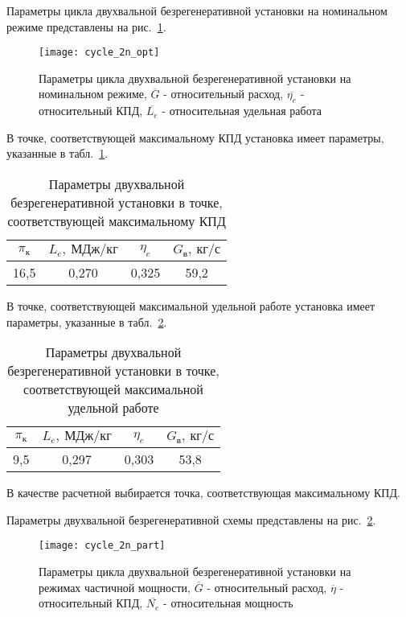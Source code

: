 Параметры цикла двухвальной безрегенеративной установки на номинальном режиме представлены на рис.~\ref{img:cycle_2n_opt}.

\begin{figure}[H]
    \centering
    \texttt{[image: cycle\_2n\_opt]}
    \caption{Параметры цикла двухвальной безрегенеративной установки на номинальном режиме,
	$\overline{G}$ - относительный расход, $\overline{\eta_e}$ - относительный КПД, $\overline{L_e}$ - относительная удельная работа}
    \label{img:cycle_2n_opt}
\end{figure}

В точке, соответствующей максимальному КПД установка имеет параметры, указанные в табл.~\ref{tab:cycle_2n_max_eta}.

\clearpage
\begin{longtable}{|c|c|c|c|}
	\caption{Параметры двухвальной безрегенеративной установки в точке, соответствующей максимальному КПД}
	\label{tab:cycle_2n_max_eta}
	\hline
	\textbf{$\pi_к$} & \textbf{$L_e, \ МДж/кг$} & \textbf{$\eta_e$} & \textbf{$G_в, \ кг/с$} \\ \hline
	16,5 & 0,270 & 0,325 & 59,2 \\ \hline
\end{longtable}


В точке, соответствующей максимальной удельной работе установка имеет параметры, указанные в табл.~\ref{tab:cycle_2n_max_labour}.
\begin{longtable}{|c|c|c|c|}
	\caption{Параметры двухвальной безрегенеративной установки в точке, соответствующей максимальной удельной работе} 
	\label{tab:cycle_2n_max_labour}
	\hline
	\textbf{$\pi_к$} & \textbf{$L_e, \ МДж/кг$} & \textbf{$\eta_e$} & \textbf{$G_в, \ кг/с$} \\ \hline
	9,5 & 0,297 & 0,303 & 53,8 \\ \hline
\end{longtable}

В качестве расчетной выбирается точка, соответствующая максимальному КПД.

Параметры двухвальной безрегенеративной схемы представлены на рис.~\ref{img:cycle_2n_part}.

\begin{figure}[H]
    \centering
    \texttt{[image: cycle\_2n\_part]}
    \caption{Параметры цикла двухвальной безрегенеративной установки на режимах частичной мощности,
	$\overline{G}$ - относительный расход, $\overline{\eta}$ - относительный КПД, $\overline{N_e}$ - относительная мощность}
    \label{img:cycle_2n_part}
\end{figure}


